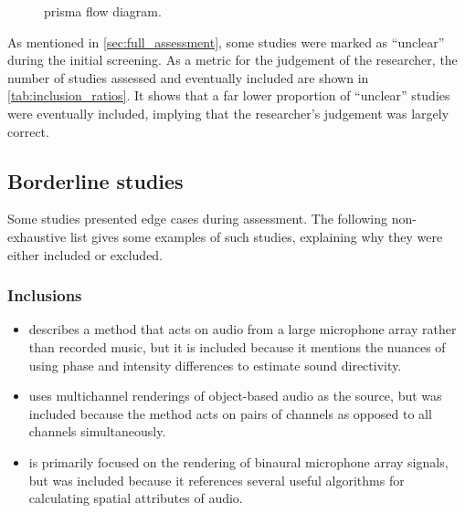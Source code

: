 \documentclass[referee,pdflatex,sn-mathphys-num]{sn-jnl}%
\newcommand{\q}[1]{\enquote{#1}}
\begin{document}
\begin{figure}[htb]
\caption{\gls{prisma} flow diagram.}
\label{fig:rejection_flow}
\centering
\resizebox{0.95\linewidth}{!}{
  
}
\end{figure}

As mentioned in \cref{sec:full_assessment}, some studies were marked as \q{unclear} during the initial screening. As a metric for the judgement of the researcher, the number of studies assessed and eventually included are shown in \cref{tab:inclusion_ratios}. It shows that a far lower proportion of \q{unclear} studies were eventually included, implying that the researcher's judgement was largely correct.

\begin{table}[h]
  \caption{Proportions of studies that were included in the review, split by clarity.}
  \label{tab:inclusion_ratios}
  
\end{table}


\subsection{Borderline studies}
\label{sec:borderline}

Some studies presented edge cases during assessment. The following non-exhaustive list gives some examples of such studies, explaining why they were either included or excluded.

\subsubsection*{Inclusions}
\begin{itemize}
    \item \cite{pollowMeasuringDirectivitiesNatural2009} describes a method that acts on audio from a large microphone array rather than recorded music, but it is included because it mentions the nuances of using phase and intensity differences to estimate sound directivity.
    \item \cite{bourbonInvestigationImmersiveContemporary2023} uses multichannel renderings of object-based audio as the source, but was included because the method acts on pairs of channels as opposed to all channels simultaneously.
    \item \cite{fernandezEnhancingBinauralRendering2022} is primarily focused on the rendering of binaural microphone array signals, but was included because it references several useful algorithms for calculating spatial attributes of audio.
\end{itemize}
\end{document}
